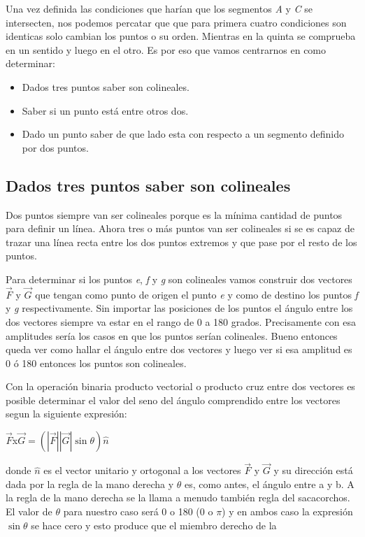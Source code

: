 Una vez definida las condiciones que harían que los segmentos {\em A} y {\em C} se intersecten, nos podemos percatar que que para primera cuatro condiciones son identicas solo cambian los puntos o su orden. Mientras en la quinta se comprueba en un sentido y luego en el otro. Es por eso que vamos centrarnos en como determinar:

\begin{itemize}
	\item Dados tres puntos saber son colineales.
	\item Saber si un punto está entre otros dos.
	\item Dado un punto saber de que lado esta con respecto a un segmento definido por dos puntos.
\end{itemize}

\subsection{Dados tres puntos saber son colineales} 
Dos puntos siempre van ser colineales porque es la mínima cantidad de puntos para definir un línea. Ahora tres o más puntos van ser colineales si se es capaz de trazar una línea recta entre los dos puntos extremos y que pase por el resto de los puntos. 


Para determinar si los puntos \emph{e}, \emph{f} y \emph{g} son colineales 
vamos construir dos vectores  $\overrightarrow{F}$ y  $\overrightarrow{G}$ 
que tengan como punto de origen el punto {\em e} y como de destino los 
puntos \emph{f} y \emph{g} respectivamente. Sin importar las posiciones de 
los puntos el ángulo entre los dos vectores siempre va estar en el rango 
de 0 a 180 grados. Precisamente con esa amplitudes sería los casos en que 
los puntos serían colineales. Bueno entonces queda ver como hallar el 
ángulo entre dos vectores y luego ver si esa amplitud es 0 ó 180 entonces 
los puntos son colineales.

Con la operación binaria producto vectorial o producto cruz entre dos vectores es posible determinar el valor del seno del ángulo comprendido entre los vectores segun la siguiente expresión:

$\overrightarrow{F}$x$\overrightarrow{G} = (|\overrightarrow{F}||\overrightarrow{G}|\sin \theta)\hat n$


donde $\hat n$ es el vector unitario y ortogonal a los vectores 
$\overrightarrow{F}$ y $\overrightarrow{G}$ y su dirección está dada por la 
regla de la mano derecha y $\theta$ es, como antes, el ángulo entre a y b. 
A la regla de la mano derecha se la llama a menudo también regla del 
sacacorchos. El valor de $\theta$ para nuestro caso será 0 o 180 (0 o 
$\pi$) y en ambos caso la expresión $\sin \theta$ se hace cero y esto 
produce que el miembro derecho de la 

